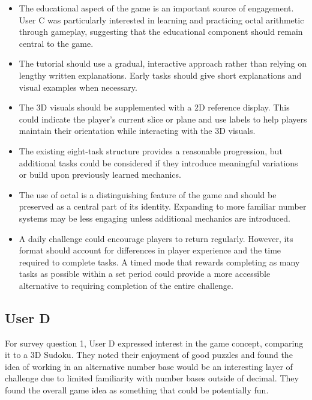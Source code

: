\documentclass{article}
\begin{document}
\begin{itemize}
  \item The educational aspect of the game is an important source of
  engagement. User C was particularly interested in learning and practicing
  octal arithmetic through gameplay, suggesting that the educational
  component should remain central to the game.

  \item The tutorial should use a gradual, interactive approach rather than
  relying on lengthy written explanations. Early tasks should give
  short explanations and visual examples when necessary.

  \item The 3D visuals should be supplemented with a 2D reference display.
  This could indicate the player's current slice or plane and use labels to
  help players maintain their orientation while interacting with the 3D visuals.

  \item The existing eight-task structure provides a reasonable progression,
  but additional tasks could be considered if they introduce meaningful
  variations or build upon previously learned mechanics.

  \item The use of octal is a distinguishing feature of the game and should
  be preserved as a central part of its identity. Expanding to more familiar
  number systems may be less engaging unless additional mechanics are
  introduced.

  \item A daily challenge could encourage players to return regularly.
  However, its format should account for differences in player experience
  and the time required to complete tasks. A timed mode that rewards
  completing as many tasks as possible within a set period could provide
  a more accessible alternative to requiring completion of the entire
  challenge.
\end{itemize}

\subsection{User D}

For survey question 1, User D expressed interest in the game concept, comparing it to a 3D Sudoku. They noted their enjoyment
of good puzzles and found the idea of working in an alternative number base would be an interesting layer of challenge due to limited familiarity
with number bases outside of decimal. They found the overall game idea as something that could be potentially fun.
\end{document}
